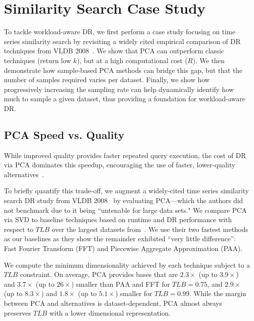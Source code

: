 \section{Similarity Search Case Study}
\label{sec:sampling}

To tackle workload-aware DR, we first perform a case study focusing on time series similarity search by revisiting a widely cited empirical comparison of DR techniques from VLDB 2008~\cite{keogh-study}. 
We show that PCA can outperform classic techniques (return low $k$), but at a high computational cost ($R$).
We then demonstrate how sample-based PCA methods can bridge this gap, but that the number of samples required varies per dataset.
Finally, we show how progressively increasing the sampling rate can help dynamically identify how much to sample a given dataset, thus providing a foundation for workload-aware DR.

\subsection{PCA Speed vs. Quality}

While improved quality provides faster repeated query execution, the cost of DR via PCA dominates this speedup, encouraging the use of faster, lower-quality alternatives~\cite{keogh-study}. 

To briefly quantify this trade-off, we augment a widely-cited time series similarity search DR study from VLDB 2008~\cite{keogh-study} by evaluating PCA---which the authors did not benchmark due to it being ``untenable for large data sets." 
We compare PCA via SVD to baseline techniques based on runtime and DR performance with respect to $TLB$ over the largest datasets from~\cite{keogh-study}. 
We use their two fastest methods as our baselines as they show the remainder exhibited ``very little difference'': Fast Fourier Transform (FFT) and Piecewise Aggregate Approximation (PAA).

We compute the minimum dimensionality achieved by each technique subject to a $TLB$ constraint. 
On average, PCA provides bases that are $2.3\times$ (up to $3.9\times$) and $3.7\times$ (up to $26\times$)  smaller than PAA and FFT for $TLB = 0.75$, and $2.9\times$ (up to $8.3\times$) and $1.8\times$ (up to $5.1\times$) smaller for $TLB = 0.99$.
While the margin between PCA and alternatives is dataset-dependent, PCA almost always preserves $TLB$ with a lower dimensional representation.

%

